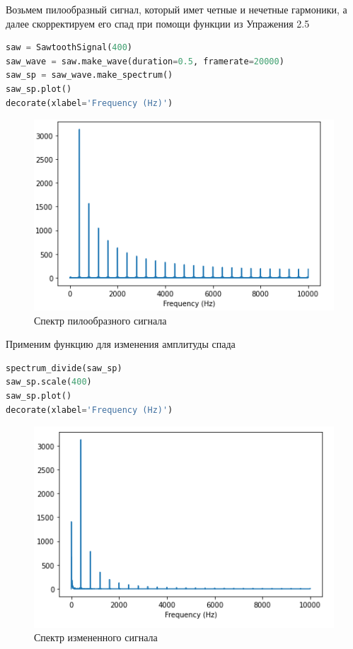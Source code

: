 Возьмем пилообразный сигнал, который имет четные и нечетные гармоники, а далее скорректируем его спад при помощи функции из Упражения 2.5

\begin{lstlisting}[language=Python]
saw = SawtoothSignal(400)
saw_wave = saw.make_wave(duration=0.5, framerate=20000)
saw_sp = saw_wave.make_spectrum()
saw_sp.plot()
decorate(xlabel='Frequency (Hz)')
\end{lstlisting}

\begin{figure}[H]
	\begin{center}
		\includegraphics[scale=1]{fig/lab02/lab02_12.png}
		\caption{Спектр пилообразного сигнала}
	\end{center}
\end{figure}

Применим функцию для изменения амплитуды спада

\begin{lstlisting}[language=Python]
spectrum_divide(saw_sp)
saw_sp.scale(400)
saw_sp.plot()
decorate(xlabel='Frequency (Hz)')
\end{lstlisting}

\begin{figure}[H]
	\begin{center}
		\includegraphics[scale=1]{fig/lab02/lab02_13.png}
		\caption{Спектр измененного сигнала}
	\end{center}
\end{figure}

